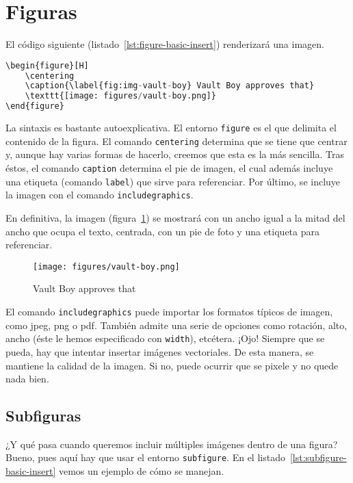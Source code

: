 \section{Figuras}

El código siguiente (listado~\ref{lst:figure-basic-insert}) renderizará una imagen.

\begin{lstlisting}[language=python, caption=Inserción de una figura,label={lst:figure-basic-insert}]
\begin{figure}[H]
    \centering
    \caption{\label{fig:img-vault-boy} Vault Boy approves that}
    \texttt{[image: figures/vault-boy.png]}
\end{figure}
\end{lstlisting}

La sintaxis es bastante autoexplicativa. El entorno \texttt{figure} es el que delimita el contenido de la figura. El comando \texttt{centering} determina que se tiene que centrar y, aunque hay varias formas de hacerlo, creemos que esta es la más sencilla. Tras éstos, el comando \texttt{caption} determina el pie de imagen, el cual además incluye una etiqueta (comando \texttt{label}) que sirve para referenciar. Por último, se incluye la imagen con el comando \texttt{includegraphics}.

En definitiva, la imagen (figura~\ref{fig:img-vault-boy}) se mostrará con un ancho igual a la mitad del ancho que ocupa el texto, centrada, con un pie de foto y una etiqueta para referenciar.

\begin{figure}[H]
    \centering
    \caption{\label{fig:img-vault-boy} Vault Boy approves that}
    \texttt{[image: figures/vault-boy.png]}
\end{figure}

El comando \texttt{includegraphics} puede importar los formatos típicos de imagen, como jpeg, png o pdf. También admite una serie de opciones como rotación, alto, ancho (éste le hemos especificado con \texttt{width}), etcétera. ¡Ojo! Siempre que se pueda, hay que intentar insertar imágenes vectoriales. De esta manera, se mantiene la calidad de la imagen. Si no, puede ocurrir que se pixele y no quede nada bien.

\subsection{Subfiguras}

¿Y qué pasa cuando queremos incluir múltiples imágenes dentro de una figura? Bueno, pues aquí hay que usar el entorno \texttt{subfigure}. En el listado~\ref{lst:subfigure-basic-insert} vemos un ejemplo de cómo se manejan.

